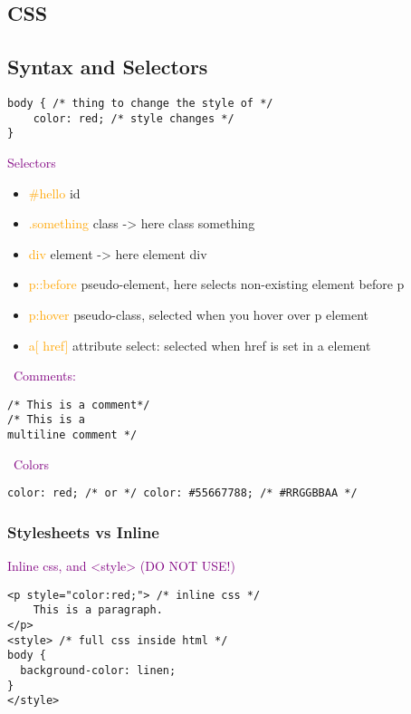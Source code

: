 \documentclass[main.tex,fontsize=6pt,paper=a4,paper=landscape,DIV=calc,]{scrartcl}
\begin{document}
\begin{multicols*}{4}
\section{CSS}
\subsection{Syntax and Selectors}
\vspace{-2mm}
\begin{lstlisting}
body { /* thing to change the style of */ 
    color: red; /* style changes */
}
\end{lstlisting}
\vspace{2mm}
\textcolor{purple}{Selectors}
\begin{itemize}
\item \textcolor{orange}{\#hello} id
\item \textcolor{orange}{.something} class -> here class something
\item \textcolor{orange}{div} element -> here element div
\item \textcolor{orange}{p::before} pseudo-element, here selects non-existing element before p
\item \textcolor{orange}{p:hover} pseudo-class, selected when you hover over p element
\item \textcolor{orange}{a[ href]} attribute select: selected when href is set in a element
\end{itemize} 
\, \newline
\textcolor{purple}{Comments:}
\vspace{-2mm}
\begin{lstlisting}
/* This is a comment*/ 
/* This is a 
multiline comment */
\end{lstlisting}
\vspace{2mm}
\, \newline
\textcolor{purple}{Colors}
\vspace{-2mm}
\begin{lstlisting}
color: red; /* or */ color: #55667788; /* #RRGGBBAA */
\end{lstlisting}
\vspace{2mm}

\subsubsection{Stylesheets vs Inline}
\textcolor{purple}{Inline css, and <style> (DO NOT USE!)}
\vspace{-2mm}
\begin{lstlisting}
<p style="color:red;"> /* inline css */
    This is a paragraph.
</p>
<style> /* full css inside html */
body {
  background-color: linen;
}
</style>
\end{lstlisting}
\vspace{2mm}


\end{multicols*}
\end{document}
